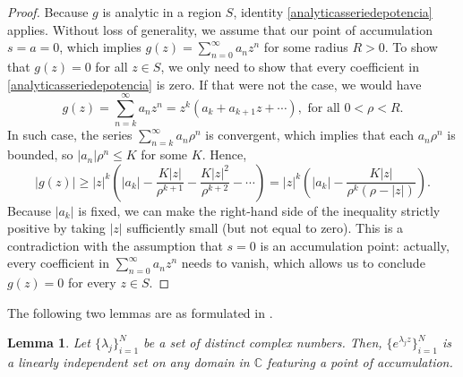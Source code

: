 \documentclass[12pt]{report} %
\newtheorem{lemma}{Lemma}
\begin{document}
\begin{proof}
  Because $g$ is analytic in a region $S$, identity
  \eqref{analyticasseriedepotencia} applies. Without loss of generality, we
  assume that our point of accumulation $s = a = 0$, which implies $g (z) =
    \sum_{n = 0}^{\infty} a_n z^n$ for some radius $R > 0$. To show that $g (z)
    = 0$ for all $z \in S$, we only need to show that every coefficient in
  \eqref{analyticasseriedepotencia} is zero. If that were not the case, we
  would have
  \[ g (z) = \sum_{n = k}^{\infty} a_n z^n = z^k (a_k + a_{k + 1} z + \cdots),
    \text{ for all } 0 < \rho < R. \]
  In such case, the series $\sum_{n = k}^{\infty} a_n \rho^n$ is convergent,
  which implies that each $a_n \rho^n$ is bounded, so $| a_n | \rho^n \leq K$
  for some $K$. Hence,
  \[ | g (z) | \geq | z |^k \left( | a_k | - \frac{K | z |}{\rho^{k + 1}} -
    \frac{K | z |^2}{\rho^{k + 2}} - \cdots \right) = | z |^k \left( | a_k |
    - \frac{K | z |}{\rho^k (\rho - | z |)} \right) . \]
  Because $| a_k |$ is fixed, we can make the right-hand side of the
  inequality strictly positive by taking $| z |$ sufficiently small (but not
  equal to zero). This is a contradiction with the assumption that $s = 0$ is
  an accumulation point: actually, every coefficient in $\sum_{n = 0}^{\infty}
    a_n z^n$ needs to vanish, which allows us to conclude $g (z) = 0$ for every
  $z \in S$.
\end{proof}

The following two lemmas are as formulated in {\cite{cheneylight2009course}}.

\begin{lemma}
  \label{lemma-linearly-independent-set-featuring-accumulation}Let $\{
    \lambda_j \}_{i = 1}^N$ be a set of distinct complex numbers. Then, $\{
    e^{\lambda_j z} \}_{i = 1}^N$ is a linearly independent set on any domain in
  $\mathbb{C}$ featuring a point of accumulation.
\end{lemma}
\end{document}
